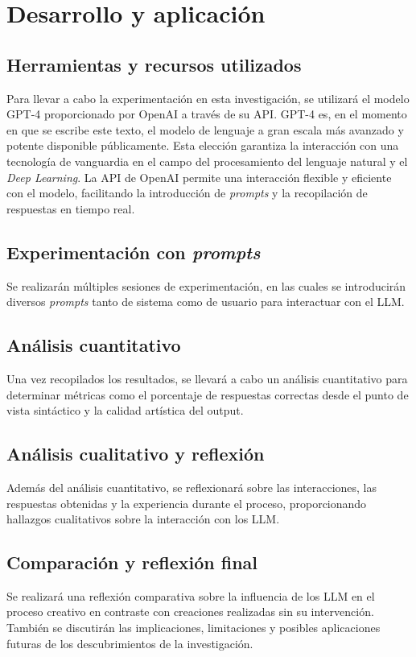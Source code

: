 \section{Desarrollo y aplicación}

\subsection{Herramientas y recursos utilizados}
Para llevar a cabo la experimentación en esta investigación, se utilizará el modelo GPT-4 proporcionado por OpenAI a través de su API. GPT-4 es, en el momento en que se escribe este texto, el modelo de lenguaje a gran escala más avanzado y potente disponible públicamente. Esta elección garantiza la interacción con una tecnología de vanguardia en el campo del procesamiento del lenguaje natural y el \textit{Deep Learning}. La API de OpenAI permite una interacción flexible y eficiente con el modelo, facilitando la introducción de \textit{prompts} y la recopilación de respuestas en tiempo real.

\subsection{Experimentación con \textit{prompts}}
Se realizarán múltiples sesiones de experimentación, en las cuales se introducirán diversos \textit{prompts} tanto de sistema como de usuario para interactuar con el LLM.

\subsection{Análisis cuantitativo}
Una vez recopilados los resultados, se llevará a cabo un análisis cuantitativo para determinar métricas como el porcentaje de respuestas correctas desde el punto de vista sintáctico y la calidad artística del output.

\subsection{Análisis cualitativo y reflexión}
Además del análisis cuantitativo, se reflexionará sobre las interacciones, las respuestas obtenidas y la experiencia durante el proceso, proporcionando hallazgos cualitativos sobre la interacción con los LLM.

\subsection{Comparación y reflexión final}
Se realizará una reflexión comparativa sobre la influencia de los LLM en el proceso creativo en contraste con creaciones realizadas sin su intervención. También se discutirán las implicaciones, limitaciones y posibles aplicaciones futuras de los descubrimientos de la investigación.